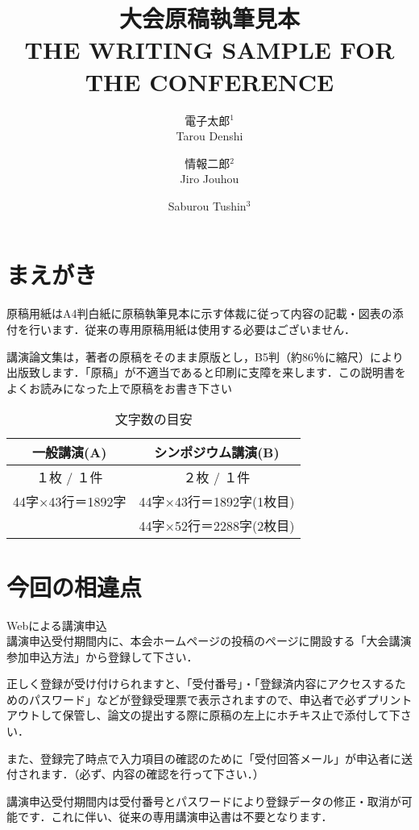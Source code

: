 \documentclass[twocolumn, a4paper]{ieicejsp}
\title{{\bf 大会原稿執筆見本}
  {\normalsize \\ THE  WRITING  SAMPLE  FOR  THE  CONFERENCE}}
\author{
    電子太郎$^1$ \\ Tarou  Denshi \and
    情報二郎$^2$ \\ Jiro Jouhou \and
    Saburou Tushin$^3$
  }
\begin{document}
\maketitle
\section{まえがき}
原稿用紙はA4判白紙に原稿執筆見本に示す体裁に従って内容の記載・図表の添付を行います．従来の専用原稿用紙は使用する必要はございません．

講演論文集は，著者の原稿をそのまま原版とし，B5判（約86％に縮尺）により出版致します．「原稿」が不適当であると印刷に支障を来します．この説明書をよくお読みになった上で原稿をお書き下さい
\begin{table}[h]
  \small
  \caption{文字数の目安}
  \begin{tabular}[t]{|c|c|}
    \hline
    一般講演(A)       & シンポジウム講演(B)      \\
    \hline
    １枚 / １件       & ２枚 / １件              \\
    44字×43行＝1892字 & 44字×43行＝1892字(1枚目) \\
                      & 44字×52行＝2288字(2枚目) \\
    \hline
  \end{tabular}
\end{table}

\section{今回の相違点}
\begin{newenumerate}
  \item Webによる講演申込 \\
  講演申込受付期間内に、本会ホームページの投稿のページに開設する「大会講演参加申込方法」から登録して下さい．

  正しく登録が受け付けられますと、「受付番号」・「登録済内容にアクセスするためのパスワード」などが登録受理票で表示されますので、申込者で必ずプリントアウトして保管し、論文の提出する際に原稿の左上にホチキス止で添付して下さい．

  また、登録完了時点で入力項目の確認のために「受付回答メール」が申込者に送付されます．（必ず、内容の確認を行って下さい．）

  講演申込受付期間内は受付番号とパスワードにより登録データの修正・取消が可能です．これに伴い、従来の専用講演申込書は不要となります．
\end{newenumerate}
\end{document}
